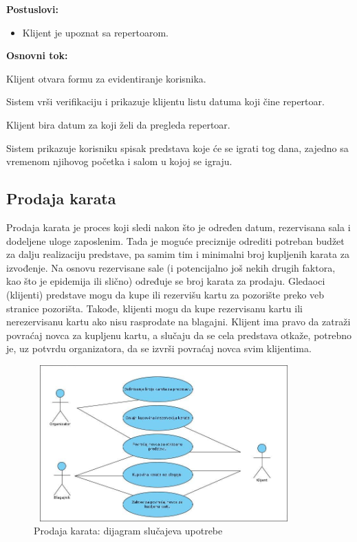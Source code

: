 \documentclass[a4paper]{article}
\begin{document}
\noindent\textbf{Postuslovi:} 
  \begin{itemize}
    \item Klijent je upoznat sa repertoarom.
  \end{itemize}

\noindent\textbf{Osnovni tok:}
  \begin{legal}
    \item Klijent otvara formu za evidentiranje korisnika.
    \item Sistem vrši verifikaciju i prikazuje klijentu listu datuma koji čine repertoar. 
    \item Klijent bira datum za koji želi da pregleda repertoar.
    \item Sistem prikazuje korisniku spisak predstava koje će se igrati tog dana, zajedno sa vremenom njihovog početka i salom u kojoj se igraju.
  \end{legal}

\newpage
\subsection{Prodaja karata}
Prodaja karata je proces koji sledi nakon što je određen datum, rezervisana sala i dodeljene uloge
zaposlenim. Tada je moguće preciznije odrediti potreban budžet za dalju realizaciju predstave, pa
samim tim i minimalni broj kupljenih karata za izvođenje. Na osnovu rezervisane sale (i potencijalno još 
nekih drugih faktora, kao što je epidemija ili slično) određuje se broj karata za prodaju. Gledaoci 
(klijenti) predstave mogu da kupe ili rezervišu kartu za pozorište preko veb stranice pozorišta. 
Takođe, klijenti mogu da kupe rezervisanu kartu ili nerezervisanu kartu ako nisu rasprodate na blagajni.
Klijent ima pravo da zatraži povraćaj novca za kupljenu kartu, a slučaju da se cela predstava otkaže,
potrebno je, uz potvrdu organizatora, da se izvrši povraćaj novca svim klijentima.

\begin{figure}[H]
  \begin{center}
      \includegraphics[width=100mm,height=60mm]{../images/usecase_prodaja_karata.jpg}
  \end{center}
  \caption{Prodaja karata: dijagram slučajeva upotrebe}
  \label{usecase_prodaja_karata}
\end{figure}
\end{document}
